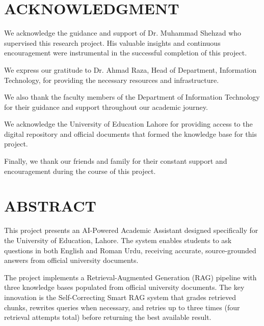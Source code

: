 \documentclass[12pt,a4paper]{book}
\numberwithin{table}{chapter}
\numberwithin{figure}{chapter}
\numberwithin{equation}{chapter}
\begin{document}
\chapter*{ACKNOWLEDGMENT}

\bigskip
We acknowledge the guidance and support of Dr. Muhammad Shehzad who supervised this research project. His valuable insights and continuous encouragement were instrumental in the successful completion of this project.

\bigskip
We express our gratitude to Dr. Ahmad Raza, Head of Department, Information Technology, for providing the necessary resources and infrastructure.

\bigskip
We also thank the faculty members of the Department of Information Technology for their guidance and support throughout our academic journey.

\bigskip
We acknowledge the University of Education Lahore for providing access to the digital repository and official documents that formed the knowledge base for this project.

\bigskip
Finally, we thank our friends and family for their constant support and encouragement during the course of this project.

\clearpage

\chapter*{ABSTRACT}

\bigskip
This project presents an AI-Powered Academic Assistant designed specifically for the University of Education, Lahore. The system enables students to ask questions in both English and Roman Urdu, receiving accurate, source-grounded answers from official university documents.

\bigskip
The project implements a Retrieval-Augmented Generation (RAG) pipeline with three knowledge bases populated from official university documents. The key innovation is the Self-Correcting Smart RAG system that grades retrieved chunks, rewrites queries when necessary, and retries up to three times (four retrieval attempts total) before returning the best available result.
\end{document}
